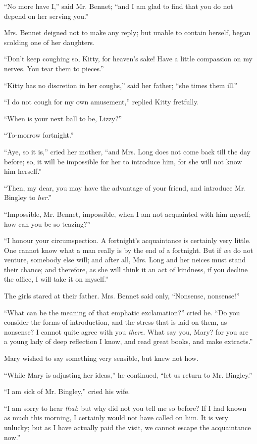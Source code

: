“No more have I,” said Mr. Bennet; “and I am glad
to find that you do not depend on her serving you.”

Mrs. Bennet deigned not to make any reply; but
unable to contain herself, began scolding one of her
daughters.

“Don’t keep coughing so, Kitty, for heaven’s sake!
Have a little compassion on my nerves. You tear them
to pieces.”

“Kitty has no discretion in her coughs,” said her
father; “she times them ill.”

“I do not cough for my own amusement,” replied
Kitty fretfully.

“When is your next ball to be, Lizzy?”

“To-morrow fortnight.”

“Aye, so it is,” cried her mother, “and Mrs. Long
does not come back till the day before; so, it will be
impossible for her to introduce him, for she will not know
him herself.”

“Then, my dear, you may have the advantage of your
friend, and introduce Mr. Bingley to \textit{her}.”

“Impossible, Mr. Bennet, impossible, when I am
not acquainted with him myself; how can you be so
teazing?”

“I honour your circumspection. A fortnight’s acquaintance
is certainly very little. One cannot know what
a man really is by the end of a fortnight. But if \textit{we} do
not venture, somebody else will; and after all, Mrs. Long
and her neices must stand their chance; and therefore,
as she will think it an act of kindness, if you decline the
office, I will take it on myself.”

The girls stared at their father. Mrs. Bennet said only,
“Nonsense, nonsense!”

“What can be the meaning of that emphatic exclamation?”
cried he. “Do you consider the forms of introduction,
and the stress that is laid on them, as nonsense?
I cannot quite agree with you \textit{there}. What say you,
Mary? for you are a young lady of deep reflection I know,
and read great books, and make extracts.”

Mary wished to say something very sensible, but knew
not how.

“While Mary is adjusting her ideas,” he continued,
“let us return to Mr. Bingley.”

“I am sick of Mr. Bingley,” cried his wife.

“I am sorry to hear \textit{that}; but why did not you tell
me so before? If I had known as much this morning,
I certainly would not have called on him. It is very
unlucky; but as I have actually paid the visit, we cannot
escape the acquaintance now.”

